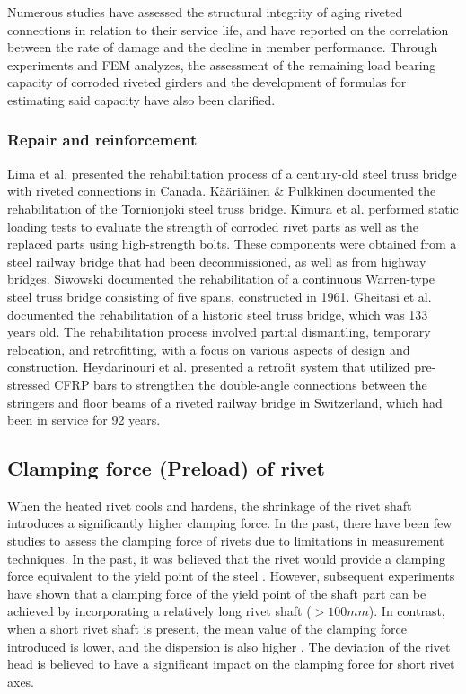 Numerous studies\cite{imam2008,Ryoichi2013,1987163,hisanori1991} have assessed the structural integrity of aging riveted connections in relation to their service life, and have reported on the correlation between the rate of damage and the decline in member performance. Through experiments and \ac{FEM} analyzes\cite{nakata2016, Yurika2019,chen2022jp,cheniabse2022,Pipinato2014ResidualApproach,Bertolesi2021FatigueApproach}, the assessment of the remaining load bearing capacity of corroded riveted girders and the development of formulas for estimating said capacity have also been clarified. 

\subsubsection{Repair and reinforcement}
Lima et al.\cite{lima2008} presented the rehabilitation process of a century-old steel truss bridge with riveted connections in Canada. Kääriäinen \& Pulkkinen \cite{kaaria2002} documented the rehabilitation of the Tornionjoki steel truss bridge. Kimura et al.\cite{kimura2009} performed static loading tests to evaluate the strength of corroded rivet parts as well as the replaced parts using high-strength bolts. These components were obtained from a steel railway bridge that had been decommissioned, as well as from highway bridges. Siwowski \cite{siwowski2013} documented the rehabilitation of a continuous Warren-type steel truss bridge consisting of five spans, constructed in 1961. Gheitasi et al. \cite{Gheitasi2022} documented the rehabilitation of a historic steel truss bridge, which was 133 years old. The rehabilitation process involved partial dismantling, temporary relocation, and retrofitting, with a focus on various aspects of design and construction. Heydarinouri et al. \cite{Heydarinouri2021} presented a retrofit system that utilized pre-stressed CFRP bars to strengthen the double-angle connections between the stringers and floor beams of a riveted railway bridge in Switzerland, which had been in service for 92 years.



\subsection{Clamping force (Preload) of rivet}

When the heated rivet cools and hardens, the shrinkage of the rivet shaft introduces a significantly higher clamping force. In the past, there have been few studies to assess the clamping force of rivets due to limitations in measurement techniques. In the past, it was believed that the rivet would provide a clamping force equivalent to the yield point of the steel \cite{VanMaarschalkerwaart1982FatigueJoints}. However, subsequent experiments have shown that a clamping force of the yield point of the shaft part can be achieved by incorporating a relatively long rivet shaft ($>100 mm$). In contrast, when a short rivet shaft is present, the mean value of the clamping force introduced is lower, and the dispersion is also higher \cite{Zhou1994FatigueMembers, Baron1953TheJoints}. The deviation of the rivet head is believed to have a significant impact on the clamping force for short rivet axes.

